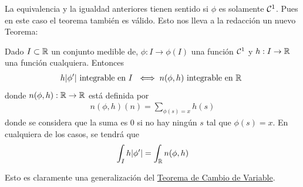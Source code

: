 La equivalencia y la igualdad anteriores tienen sentido si $\phi$ es solamente $\mathcal{C}^1$. Pues en este caso el teorema también es válido. Esto nos lleva a la redacción un nuevo Teorema:

\begin{teo}\label{teo:area}
    Dado $I \subset \mathbb{R}$ un conjunto medible de, $\phi: I \to \phi(I)$ una función $\mathcal{C}^1$ y $h:I \to \mathbb{R}$ una función cualquiera. Entonces 
    \begin{gather*}
        h|\phi'| \text{ integrable en $I$ } \iff n(\phi, h) \text{ integrable en $\mathbb{R}$ }
    \end{gather*}
    donde $n(\phi, h):\mathbb{R}\to \mathbb{R}$ está definida por
    \begin{gather*}
        n(\phi, h)(n) = \sum_{\phi(s)=x} h(s)
    \end{gather*}
    donde se considera que la suma es $0$ si no hay ningún $s$ tal que $\phi(s)=x$. En cualquiera de los casos, se tendrá que 
    \begin{gather*}
        \int_I h|\phi'| = \int_{\mathbb{R}} n(\phi, h) 
    \end{gather*}
\end{teo}

Esto es claramente una generalización del \hyperref[teo:cambio_variable]{Teorema de Cambio de Variable}.

